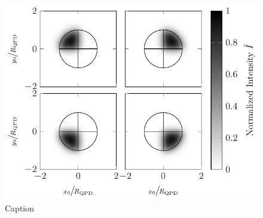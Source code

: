 \begin{figure}[tbp]
  \centering
  \includegraphics[]{Plots/cache/V_quadrant.pdf}
  \caption{Caption}
  \label{fig:Th-quadrant_Intensity}
\end{figure}


